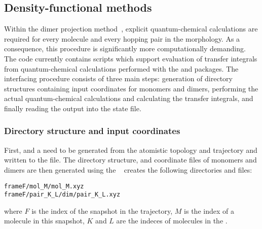 \subsection{Density-functional methods}
\label{sec:dft}

Within the dimer projection method~\cite{valeev_effect_2006,baumeier_density-functional_2010}, explicit quantum-chemical calculations are required for every molecule and every hopping pair in the morphology. As a consequence, this procedure is significantly more computationally demanding. The code currently contains scripts which support evaluation of transfer integrals from quantum-chemical calculations performed with the \gaussian and \turbomole packages. The interfacing procedure consists of three main steps: generation of directory structures containing input coordinates for monomers and dimers, performing the actual quantum-chemical calculations and calculating the transfer integrals, and finally reading the output into the state file.

\subsubsection{Directory structure and input coordinates}
First,  and a  need to be generated from the atomistic topology and trajectory and written to the \sqlstate file. The directory structure, and coordinate files of monomers and dimers are then generated using the  \calculator
\label{sec:pairdump}
\vskip 0.1cm
{\noindent \small \ctprun \opt \xmloptions \seg \xmlsegments \ \sqlstate \exe {} }
\vskip 0.1cm
 creates the following directories and files:
\begin{verbatim}
frameF/mol_M/mol_M.xyz
frameF/pair_K_L/dim/pair_K_L.xyz
\end{verbatim}
where $F$ is the index of the snapshot in the trajectory, $M$ is the index of a molecule in this snapshot, $K$ and $L$ are the indeces of molecules in the .  

